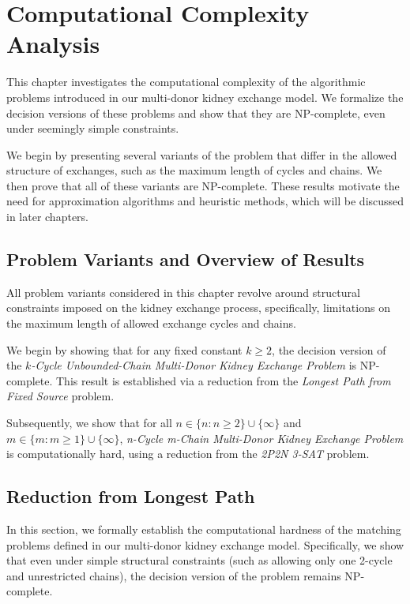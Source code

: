 \chapter{Computational Complexity Analysis}
\label{cha:computational_complexity_analysis}

This chapter investigates the computational complexity of the algorithmic problems introduced in our multi-donor kidney exchange model. We formalize the decision versions of these problems and show that they are NP-complete, even under seemingly simple constraints.

We begin by presenting several variants of the problem that differ in the allowed structure of exchanges, such as the maximum length of cycles and chains. We then prove that all of these variants are NP-complete. These results motivate the need for approximation algorithms and heuristic methods, which will be discussed in later chapters.

\section{Problem Variants and Overview of Results}

All problem variants considered in this chapter revolve around structural constraints imposed on the kidney exchange process, specifically, limitations on the maximum length of allowed exchange cycles and chains.

We begin by showing that for any fixed constant $k \ge 2$, the decision version of the \textit{$k$-Cycle Unbounded-Chain Multi-Donor Kidney Exchange Problem} is NP-complete. This result is established via a reduction from the \textit{Longest Path from Fixed Source} problem.

Subsequently, we show that for all $n \in \{n : n \ge 2\} \cup \{\infty\}$ and $m \in \{m:m \ge 1\} \cup \{\infty\}$, \textit{n-Cycle m-Chain Multi-Donor Kidney Exchange Problem} is computationally hard, using a reduction from the \textit{2P2N 3-SAT} problem.



\section{Reduction from Longest Path}

In this section, we formally establish the computational hardness of the matching problems defined in our multi-donor kidney exchange model. Specifically, we show that even under simple structural constraints (such as allowing only one 2-cycle and unrestricted chains), the decision version of the problem remains NP-complete. 

